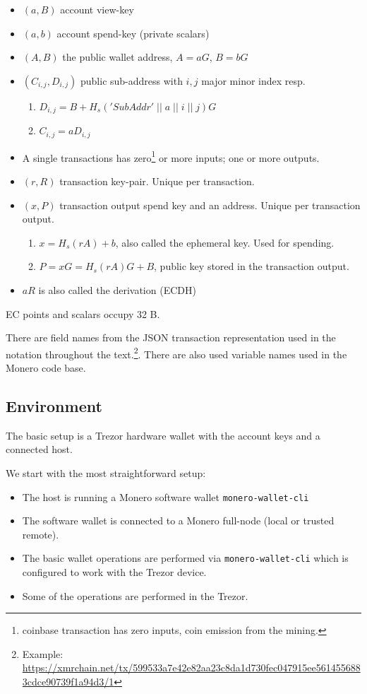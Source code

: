 \documentclass[]{article}
\begin{document}
\begin{itemize}
	\item $(a, B)$ account view-key
	\item $(a, b)$ account spend-key (private scalars)
	\item $(A, B)$ the public wallet address, $A=aG$, $B=bG$
	\item $(C_{i,j}, D_{i,j})$ public sub-address with $i, j$ major minor index resp.
	\begin{enumerate}
		\item $D_{i,j} = B + H_s('SubAddr' \; || \; a \; || \; i \; || \; j)G$
		\item $C_{i,j} = aD_{i,j}$ 
	\end{enumerate}
	\item A single transactions has zero\footnote{coinbase transaction has zero inputs, coin emission from the mining.} or more inputs; one or more outputs.
	\item $(r, R)$ transaction key-pair. Unique per transaction. 
	\item $(x, P)$ transaction output spend key and an address. Unique per transaction output.
	\begin{enumerate}
		\item $x = H_s(rA) + b$, also called the ephemeral key. Used for spending.
		\item $P = xG = H_s(rA)G + B$, public key stored in the transaction output.
	\end{enumerate}
	\item $aR$ is also called the derivation (ECDH)
\end{itemize}

EC points and scalars occupy 32 B.

There are field names from the JSON transaction representation used in the notation throughout the text.\footnote{Example: \url{https://xmrchain.net/tx/599533a7e42e82aa23c8da1d730fec047915ee5614556883cdce90739f1a94d3/1}}. There are also used variable names used in the Monero code base.

\subsection{Environment}

The basic setup is a Trezor hardware wallet with the account keys and a connected host.

We start with the most straightforward setup:
\begin{itemize}
	\item The host is running a Monero software wallet \verb|monero-wallet-cli|
	
	\item  The software wallet is connected to a Monero full-node (local or trusted remote).
	
	\item The basic wallet operations are performed via \verb|monero-wallet-cli| which is configured to work with the Trezor device.
	
	\item Some of the operations are performed in the Trezor. 
\end{itemize}
\end{document}
